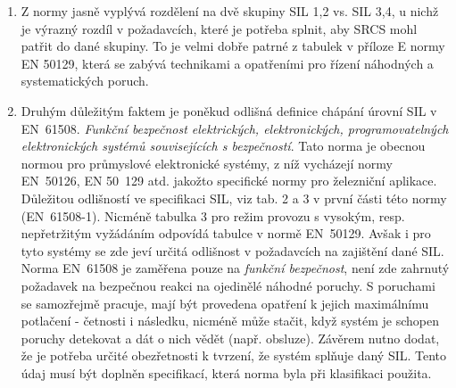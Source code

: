       \begin{enumerate}
        \item Z normy jasně vyplývá rozdělení na dvě skupiny SIL 1,2 vs. SIL 3,4, u nichž je 
              výrazný rozdíl v požadavcích, které je potřeba splnit, aby SRCS mohl patřit 
              do dané skupiny. To je velmi dobře patrné z tabulek v příloze E normy EN 50129, 
              která se zabývá technikami a opatřeními pro řízení náhodných a systematických 
              poruch. 
        \item Druhým důležitým faktem je poněkud odlišná definice chápání úrovní SIL v 
              EN~61508. \emph{Funkční bezpečnost elektrických, elektronických, programovatelných elektronických systémů souvisejících s bezpečností}. Tato norma je obecnou normou pro průmyslové elektronické systémy, z níž vycházejí normy EN~50126, EN 50~129 atd. jakožto specifické normy pro železniční aplikace. Důležitou odlišností ve specifikaci SIL, viz tab. 2 a 3 v první části této normy (EN~61508-1). Nicméně tabulka 3 pro režim provozu s vysokým, resp. nepřetržitým vyžádáním odpovídá tabulce v normě EN~50129. Avšak i pro tyto systémy se zde jeví určitá odlišnost v požadavcích na zajištění dané SIL. Norma EN~61508 je zaměřena pouze na \emph{funkční bezpečnost}, není zde zahrnutý požadavek na bezpečnou reakci na ojedinělé náhodné poruchy. S poruchami se samozřejmě pracuje, mají být provedena opatření k jejich maximálnímu potlačení - četnosti i následku, nicméně může stačit, když systém je schopen poruchy detekovat a dát o nich vědět (např. obsluze). Závěrem nutno dodat, že je potřeba určité obezřetnosti k tvrzení, že systém splňuje daný SIL. Tento údaj musí být doplněn specifikací, která norma byla při klasifikaci použita.      
      \end{enumerate}
       
       
    
    
    
    
    
    
    
    
    
    
    
    
    
    
    
    
    
    
    
    
    
    
    
    
    
    
    
    
    
    
    
    
    
    
    
    
    
    
    
    
    
    
    
    
    
    
    
    